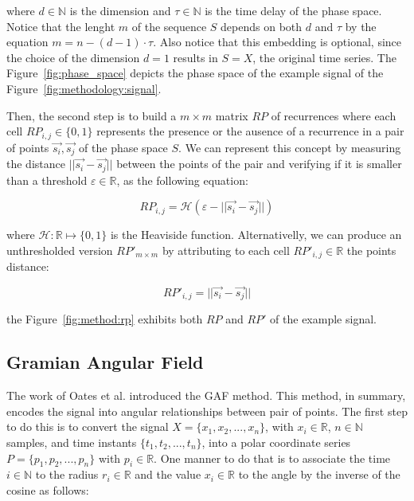 \noindent where $d \in \mathbb{N}$ is the dimension and $\tau \in \mathbb{N}$ is the time delay of the phase space. Notice that the lenght $m$ of the sequence $S$ depends on both $d$ and $\tau$ by the equation $m = n - (d-1) \cdot \tau$. Also notice that this embedding is optional, since the choice of the dimension $d=1$ results in $S=X$, the original time series. The Figure~\ref{fig:phase_space} depicts the phase space of the example signal of the Figure~\ref{fig:methodology:signal}.



Then, the second step is to build a $m \times m$ matrix $RP$ of recurrences where each cell $RP_{i,j} \in \{0,1\}$ represents the presence or the ausence of a recurrence in a pair of points $\vec{s_i},\vec{s_j}$ of the phase space $S$. We can represent this concept by measuring the distance $||\vec{s_i} - \vec{s_j}||$ between the points of the pair and verifying if it is smaller than a threshold $\varepsilon \in \mathbb{R}$, as the following equation:

\begin{equation}
    RP_{i,j} = \mathcal{H}(\varepsilon - ||\vec{s_i} - \vec{s_j}||)
\end{equation}

\noindent where $\mathcal{H}: \mathbb{R} \mapsto \{0,1\}$ is the Heaviside function. Alternativelly, we can produce an unthresholded version $RP'_{m \times m}$ by attributing to each cell $RP'_{i,j} \in \mathbb{R}$ the points distance:

\begin{equation}
    RP'_{i,j} = ||\vec{s_i} - \vec{s_j}||
\end{equation}  

\noindent the Figure~\ref{fig:method:rp} exhibits both $RP$ and $RP'$ of the example signal.



\subsection{Gramian Angular Field}

The work of Oates et al. \cite{gaf-mtf-1} introduced the \gls{GAF} method. This method, in summary, encodes the signal into angular relationships between pair of points. The first step to do this is to convert the signal $X=\{x_1,x_2,...,x_n\}$, with $x_i \in \mathbb{R}$, $n \in \mathbb{N}$ samples, and time instants $\{t_1,t_2,...,t_n\}$, into a polar coordinate series $P=\{p_1,p_2,...,p_n\}$ with $p_i \in \mathbb{R}$. One manner to do that is to associate the time $i \in \mathbb{N}$ to the radius $r_i \in \mathbb{R}$ and the value $x_i \in \mathbb{R}$ to the angle by the inverse of the cosine as follows:

